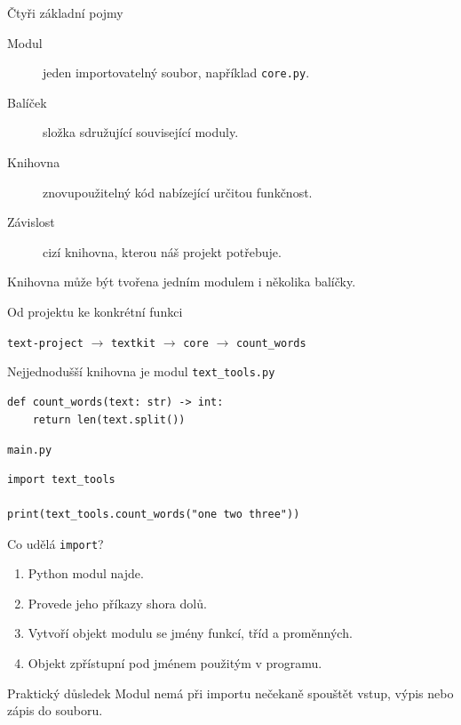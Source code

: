 \documentclass[aspectratio=169]{beamer}
\begin{document}
\begin{frame}{Čtyři základní pojmy}
  \begin{description}
    \item[Modul] jeden importovatelný soubor, například \texttt{core.py}.
    \item[Balíček] složka sdružující související moduly.
    \item[Knihovna] znovupoužitelný kód nabízející určitou funkčnost.
    \item[Závislost] cizí knihovna, kterou náš projekt potřebuje.
  \end{description}
  \vspace{2mm}
  Knihovna může být tvořena jedním modulem i několika balíčky.
\end{frame}

\begin{frame}{Od projektu ke konkrétní funkci}
  \centering
  \vspace{6mm}

  \texttt{text-project} $\rightarrow$ \texttt{textkit} $\rightarrow$
  \texttt{core} $\rightarrow$ \texttt{count\_words}
\end{frame}

\begin{frame}[fragile]{Nejjednodušší knihovna je modul}
  \texttt{text\_tools.py}
\begin{lstlisting}[style=python]
def count_words(text: str) -> int:
    return len(text.split())
\end{lstlisting}
  \texttt{main.py}
\begin{lstlisting}[style=python]
import text_tools

print(text_tools.count_words("one two three"))
\end{lstlisting}
\end{frame}

\begin{frame}{Co udělá \texttt{import}?}
  \begin{enumerate}
    \item Python modul najde.
    \item Provede jeho příkazy shora dolů.
    \item Vytvoří objekt modulu se jmény funkcí, tříd a proměnných.
    \item Objekt zpřístupní pod jménem použitým v programu.
  \end{enumerate}
  \begin{block}{Praktický důsledek}
    Modul nemá při importu nečekaně spouštět vstup, výpis nebo zápis do souboru.
  \end{block}
\end{frame}
\end{document}
